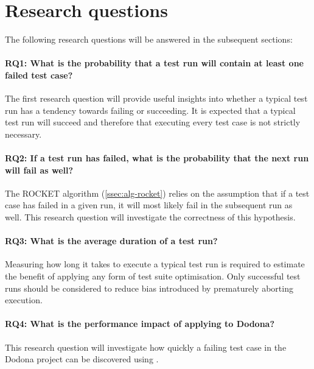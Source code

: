 
\section{Research questions}
The following research questions will be answered in the subsequent sections:

\paragraph*{RQ1: What is the probability that a test run will contain at least one failed test case?}
The first research question will provide useful insights into whether a typical test run has a tendency towards failing or succeeding. It is expected that a typical test run will succeed and therefore that executing every test case is not strictly necessary.

\paragraph*{RQ2: If a test run has failed, what is the probability that the next run will fail as well?}
The ROCKET algorithm (\autoref{ssec:alg-rocket}) relies on the assumption that if a test case has failed in a given run, it will most likely fail in the subsequent run as well. This research question will investigate the correctness of this hypothesis.

\paragraph*{RQ3: What is the average duration of a test run?}
Measuring how long it takes to execute a typical test run is required to estimate the benefit of applying any form of test suite optimisation. Only successful test runs should be considered to reduce bias introduced by prematurely aborting execution.

\paragraph*{RQ4: What is the performance impact of applying \tcp{} to Dodona?}
This research question will investigate how quickly a failing test case in the Dodona project can be discovered using \velocity{}.